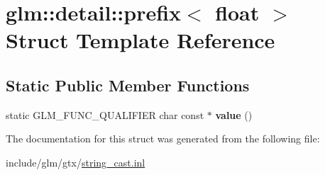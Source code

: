 \hypertarget{structglm_1_1detail_1_1prefix_3_01float_01_4}{}\section{glm\+:\+:detail\+:\+:prefix$<$ float $>$ Struct Template Reference}
\label{structglm_1_1detail_1_1prefix_3_01float_01_4}
\subsection*{Static Public Member Functions}
\begin{DoxyCompactItemize}
\item 
\mbox{\label{structglm_1_1detail_1_1prefix_3_01float_01_4_a106cde8d6d62001a05cbf21367467591}} 
static G\+L\+M\+\_\+\+F\+U\+N\+C\+\_\+\+Q\+U\+A\+L\+I\+F\+I\+ER char const  $\ast$ {\bfseries value} ()
\end{DoxyCompactItemize}


The documentation for this struct was generated from the following file\+:\begin{DoxyCompactItemize}
\item 
include/glm/gtx/\hyperlink{string__cast_8inl}{string\+\_\+cast.\+inl}\end{DoxyCompactItemize}
